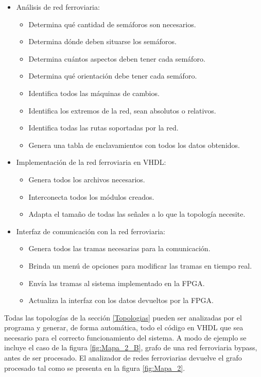 	\begin{itemize}
		\item Análisis de red ferroviaria:
		\begin{itemize}
			\item Determina qué cantidad de semáforos son necesarios.
			\item Determina dónde deben situarse los semáforos.
			\item Determina cuántos aspectos deben tener cada semáforo.
			\item Determina qué orientación debe tener cada semáforo.
			\item Identifica todos las máquinas de cambios.
			\item Identifica los extremos de la red, sean absolutos o relativos.
			\item Identifica todas las rutas soportadas por la red.
			\item Genera una tabla de enclavamientos con todos los datos obtenidos.
		\end{itemize}
		\item Implementación de la red ferroviaria en VHDL:
		\begin{itemize}
			\item Genera todos los archivos necesarios.
			\item Interconecta todos los módulos creados.
			\item Adapta el tamaño de todas las señales a lo que la topología necesite.
		\end{itemize}
		\item Interfaz de comunicación con la red ferroviaria:
		\begin{itemize}
			\item Genera todos las tramas necesarias para la comunicación.
			\item Brinda un menú de opciones para modificar las tramas en tiempo real.
			\item Envía las tramas al sistema implementado en la FPGA.
			\item Actualiza la interfaz con los datos devueltos por la FPGA.
		\end{itemize}
	\end{itemize}
	
	Todas las topologías de la sección \ref{Topologias} pueden ser analizadas por el programa y generar, de forma automática, todo el código en VHDL que sea necesario para el correcto funcionamiento del sistema. A modo de ejemplo se incluye el caso de la figura \ref{fig:Mapa_2_B}, grafo de una red ferroviaria bypass, antes de ser procesado. El analizador de redes ferroviarias devuelve el grafo procesado tal como se presenta en la figura \ref{fig:Mapa_2}.

